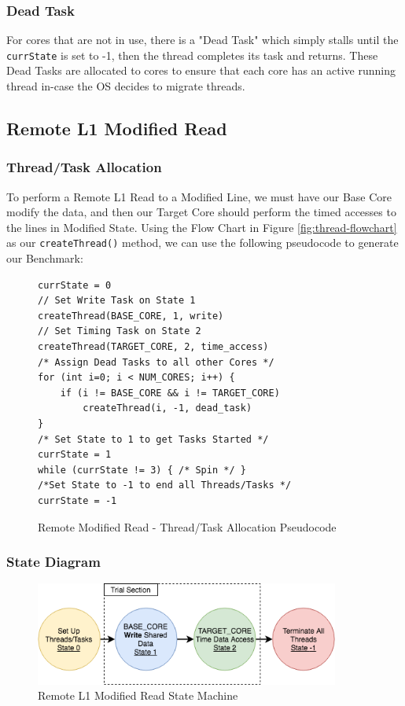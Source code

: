 \documentclass[bsc,frontabs,twoside,singlespacing,parskip,deptreport]{infthesis}     %
\begin{document}
\subsubsection{Dead Task}
For cores that are not in use, there is a "Dead Task" which simply stalls until the \texttt{currState} is set to -1, then the thread completes its task and returns. These Dead Tasks are allocated to cores to ensure that each core has an active running thread in-case the OS decides to migrate threads.

\subsection{Remote L1 Modified Read}
\subsubsection{Thread/Task Allocation}
To perform a Remote L1 Read to a Modified Line, we must have our Base Core modify the data, and then our Target Core should perform the timed accesses to the lines in Modified State. Using the Flow Chart in Figure \ref{fig:thread-flowchart} as our \texttt{createThread()} method, we can use the following pseudocode to generate our Benchmark:

\begin{figure}[!h]
    \centering
    \begin{minipage}{0.7\textwidth}
    \begin{verbatim}
currState = 0
// Set Write Task on State 1
createThread(BASE_CORE, 1, write)
// Set Timing Task on State 2
createThread(TARGET_CORE, 2, time_access)
/* Assign Dead Tasks to all other Cores */
for (int i=0; i < NUM_CORES; i++) {
    if (i != BASE_CORE && i != TARGET_CORE)
        createThread(i, -1, dead_task)
}
/* Set State to 1 to get Tasks Started */
currState = 1
while (currState != 3) { /* Spin */ }
/*Set State to -1 to end all Threads/Tasks */
currState = -1
    \end{verbatim}
    \end{minipage}
    \caption{Remote Modified Read - Thread/Task Allocation Pseudocode}
    \label{fig:remote-M-read-pseudo}
\end{figure}

\newpage
\subsubsection{State Diagram}
\begin{figure}[!h]
    \centering
    \includegraphics[width=100mm]{ModifiedState.png}
    \caption{Remote L1 Modified Read State Machine}
    \label{fig:remote-M-read-state}
\end{figure}
\end{document}
